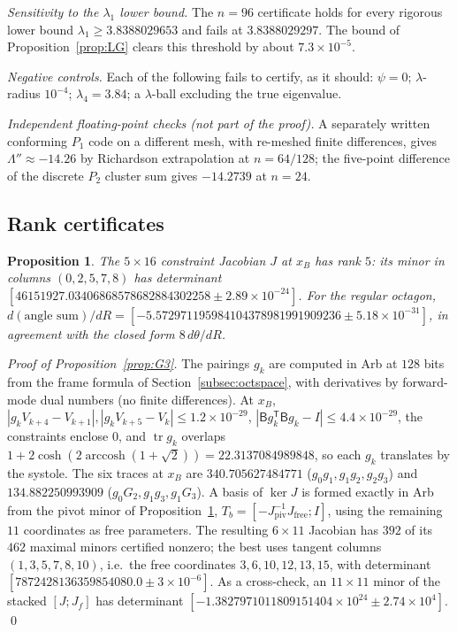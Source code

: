 \documentclass[11pt]{amsart}
\newtheorem{proposition}[theorem]{Proposition}
\theoremstyle{definition}
\theoremstyle{remark}
\newcommand{\tr}{\operatorname{tr}}
\newcommand{\arccosh}{\operatorname{arccosh}}
\newcommand{\xB}{x_B}
\begin{document}
\emph{Sensitivity to the $\lambda_1$ lower bound.} The $n=96$ certificate holds for every rigorous
lower bound $\lambda_1\ge3.8388029653$ and fails at $3.8388029297$. The bound of
Proposition~\ref{prop:LG} clears this threshold by about $7.3\times10^{-5}$.

\emph{Negative controls.} Each of the following fails to certify, as it should: $\psi=0$;
$\lambda$-radius $10^{-4}$; $\lambda_4=3.84$; a $\lambda$-ball excluding the true eigenvalue.

\emph{Independent floating-point checks (not part of the proof).} A separately written conforming
$P_1$ code on a different mesh, with re-meshed finite differences, gives $\Lambda''\approx-14.26$ by
Richardson extrapolation at $n=64/128$; the five-point difference of the discrete $P_2$ cluster sum
gives $-14.2739$ at $n=24$.

\subsection{Rank certificates}\label{subsec:rank-cert}

\begin{proposition}\label{prop:rankJ}
The $5\times16$ constraint Jacobian $J$ at $\xB$ has rank $5$: its minor in columns $(0,2,5,7,8)$ has
determinant $[46151927.03406868578682884302258\pm2.89\times10^{-24}]$. For the regular octagon,
$d(\text{angle sum})/dR=[-5.572971195984104378981991909236\pm5.18\times10^{-31}]$, in agreement with
the closed form $8\,d\theta/dR$.
\end{proposition}

\emph{Proof of Proposition~\ref{prop:G3}.} The pairings $g_k$ are computed in Arb at $128$ bits
from the frame formula of Section~\ref{subsec:octspace}, with derivatives by forward-mode dual
numbers (no finite differences). At $\xB$, $|g_kV_{k+4}-V_{k+1}|,|g_kV_{k+5}-V_k|\le1.2\times10^{-29}$,
$|\mathsf B g_k^{\mathsf T}\mathsf Bg_k-I|\le4.4\times10^{-29}$, the constraints enclose $0$, and
$\tr g_k$ overlaps $1+2\cosh(2\arccosh(1+\sqrt2))=22.3137084989848$, so each $g_k$ translates by the
systole. The six traces at $\xB$ are $340.705627484771$ ($g_0g_1,g_1g_2,g_2g_3$) and
$134.882250993909$ ($g_0G_2,g_1g_3,g_1G_3$). A basis of $\ker J$ is formed exactly in Arb from the
pivot minor of Proposition~\ref{prop:rankJ}, $T_b=[-J_{\mathrm{piv}}^{-1}J_{\mathrm{free}};I]$, using the
remaining $11$ coordinates as free parameters. The resulting $6\times11$ Jacobian has $392$ of its
$462$ maximal minors certified nonzero; the best uses tangent columns $(1,3,5,7,8,10)$, i.e.\ the
free coordinates $3,6,10,12,13,15$, with determinant $[7872428136359854080.0\pm3\times10^{-6}]$. As a
cross-check, an $11\times11$ minor of the stacked $[J;J_f]$ has determinant
$[-1.3827971011809151404\times10^{24}\pm2.74\times10^4]$. \qed
\end{document}
